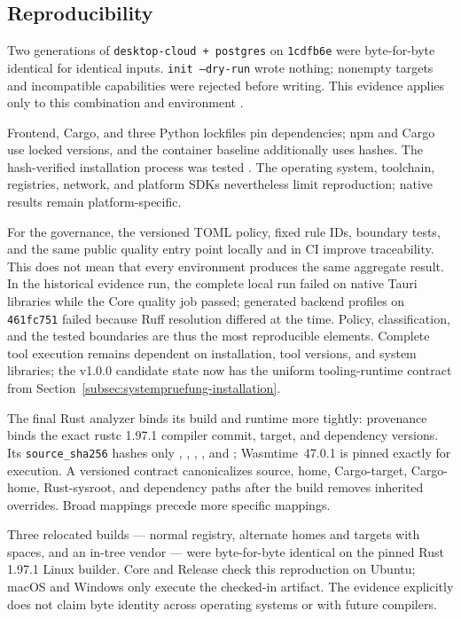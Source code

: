 \subsection{Reproducibility}
\label{subsec:reproduzierbarkeit}

Two generations of \texttt{desktop-cloud + postgres} on \texttt{1cdfb6e} were
byte-for-byte identical for identical inputs. \texttt{init --dry-run} wrote
nothing; nonempty targets and incompatible capabilities were rejected before
writing. This evidence applies only to this combination and environment
\parencite{kleiveist2026acceptance,lamb2022reproducible-builds}.

Frontend, Cargo, and three Python lockfiles pin dependencies; npm and Cargo use
locked versions, and the container baseline additionally uses hashes.
The hash-verified installation process was tested
\parencite{kleiveist2026ci,kleiveist2026container}. The operating system,
toolchain, registries, network, and platform SDKs nevertheless limit
reproduction; native results remain platform-specific.

For the governance, the versioned TOML policy, fixed rule IDs, boundary tests,
and the same public quality entry point locally and in CI improve traceability.
This does not mean that every environment produces the same aggregate result.
In the historical evidence run, the complete local run failed on native Tauri
libraries while the Core quality job passed; generated backend profiles on
\texttt{461fc751} failed because Ruff resolution differed at the time. Policy,
classification, and the tested boundaries are thus the most reproducible
elements. Complete tool execution remains dependent on installation, tool
versions, and system libraries; the v1.0.0 candidate state now has the uniform
tooling-runtime contract from
Section~\ref{subsec:systempruefung-installation}.

The final Rust analyzer binds its build and runtime more tightly: provenance
binds the exact rustc 1.97.1 compiler commit, target, and dependency versions.
Its \texttt{source\_sha256} hashes only , ,
, , and ;
Wasmtime~47.0.1 is pinned exactly for execution. A versioned contract
canonicalizes source, home, Cargo-target, Cargo-home, Rust-sysroot, and
dependency paths after the build removes inherited overrides. Broad mappings
precede more specific mappings.

Three relocated builds --- normal registry, alternate homes and targets with
spaces, and an in-tree vendor --- were byte-for-byte identical on the pinned
Rust 1.97.1 Linux builder. Core and Release check this reproduction on Ubuntu;
macOS and Windows only execute the checked-in artifact. The evidence explicitly
does not claim byte identity across operating systems or with future compilers.
